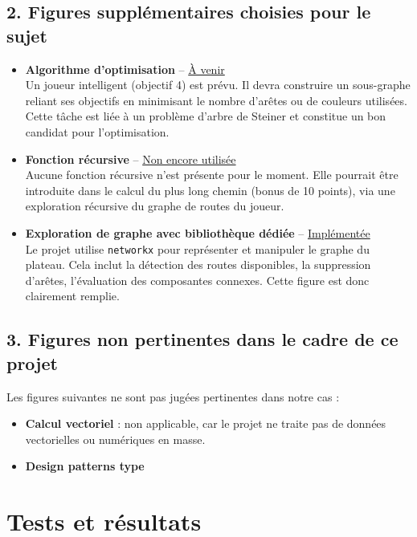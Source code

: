 \documentclass[a4paper,12pt]{report}
\begin{document}
\section*{2. Figures supplémentaires choisies pour le sujet}

\begin{itemize}
    \item \textbf{Algorithme d’optimisation} – \underline{À venir} \\
    Un joueur intelligent (objectif 4) est prévu.
    Il devra construire un sous-graphe reliant ses objectifs en minimisant le nombre d’arêtes ou de couleurs utilisées.
    Cette tâche est liée à un problème d’arbre de Steiner et constitue un bon candidat pour l’optimisation.

    \item \textbf{Fonction récursive} – \underline{Non encore utilisée} \\
    Aucune fonction récursive n’est présente pour le moment.
    Elle pourrait être introduite dans le calcul du plus long chemin (bonus de 10 points), via une exploration récursive du graphe de routes du joueur.

    \item \textbf{Exploration de graphe avec bibliothèque dédiée} – \underline{Implémentée} \\
    Le projet utilise \texttt{networkx} pour représenter et manipuler le graphe du plateau.
    Cela inclut la détection des routes disponibles, la suppression d’arêtes, l’évaluation des composantes connexes.
    Cette figure est donc clairement remplie.

\end{itemize}

\section*{3. Figures non pertinentes dans le cadre de ce projet}

Les figures suivantes ne sont pas jugées pertinentes dans notre cas :

\begin{itemize}
    \item \textbf{Calcul vectoriel} : non applicable, car le projet ne traite pas de données vectorielles ou numériques en masse.
    \item \textbf{Design patterns type}

\end{itemize}

\chapter{Tests et résultats}
\end{document}

